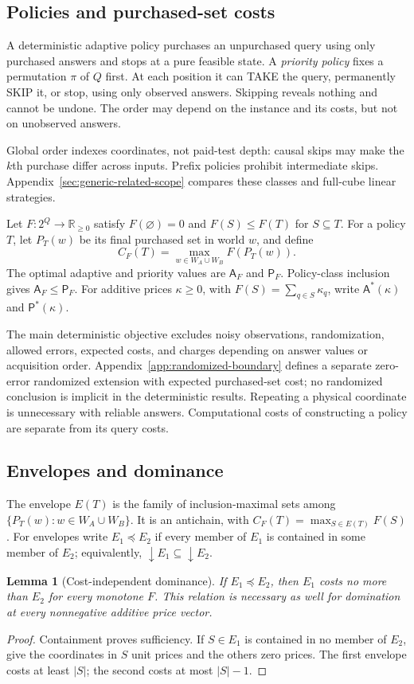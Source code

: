 \documentclass[pdflatex,sn-mathphys-num]{sn-jnl}
\newcommand{\A}{\mathsf{A}}
\newcommand{\Pcost}{\mathsf{P}}
\newcommand{\down}{\mathop{\downarrow}}
\theoremstyle{thmstyleone}
\newtheorem{lemma}[theorem]{Lemma}
\theoremstyle{thmstylethree}
\theoremstyle{thmstyletwo}
\begin{document}
\subsection{Policies and purchased-set costs}
A deterministic adaptive policy purchases an unpurchased query using only purchased answers and stops at a pure feasible state. A \emph{priority policy} fixes a permutation $\pi$ of $Q$ first. At each position it can TAKE the query, permanently SKIP it, or stop, using only observed answers. Skipping reveals nothing and cannot be undone. The order may depend on the instance and its costs, but not on unobserved answers.

Global order indexes coordinates, not paid-test depth: causal skips may make the $k$th purchase differ across inputs. Prefix policies prohibit intermediate skips. Appendix~\ref{sec:generic-related-scope} compares these classes and full-cube linear strategies.

Let $F:2^Q\to\mathbb R_{\geq0}$ satisfy $F(\varnothing)=0$ and $F(S)\leq F(T)$ for $S\subseteq T$. For a policy $T$, let $P_T(w)$ be its final purchased set in world $w$, and define
\[
 C_F(T)=\max_{w\in W_A\cup W_B} F(P_T(w)).
\]
The optimal adaptive and priority values are $\A_F$ and $\Pcost_F$. Policy-class inclusion gives $\A_F\leq\Pcost_F$. For additive prices $\kappa\geq0$, with $F(S)=\sum_{q\in S}\kappa_q$, write $\A^*(\kappa)$ and $\Pcost^*(\kappa)$.

The main deterministic objective excludes noisy observations, randomization, allowed errors, expected costs, and charges depending on answer values or acquisition order. Appendix~\ref{app:randomized-boundary} defines a separate zero-error randomized extension with expected purchased-set cost; no randomized conclusion is implicit in the deterministic results. Repeating a physical coordinate is unnecessary with reliable answers. Computational costs of constructing a policy are separate from its query costs.

\subsection{Envelopes and dominance}\label{sec:envelopes}
The envelope $E(T)$ is the family of inclusion-maximal sets among $\{P_T(w):w\in W_A\cup W_B\}$. It is an antichain, with $C_F(T)=\max_{S\in E(T)}F(S)$. For envelopes write $E_1\preceq E_2$ if every member of $E_1$ is contained in some member of $E_2$; equivalently, $\down E_1\subseteq\down E_2$.

\begin{lemma}[Cost-independent dominance]\label{lem:dominance}
If $E_1\preceq E_2$, then $E_1$ costs no more than $E_2$ for every monotone $F$. This relation is necessary as well for domination at every nonnegative additive price vector.
\end{lemma}
\begin{proof}
Containment proves sufficiency. If $S\in E_1$ is contained in no member of $E_2$, give the coordinates in $S$ unit prices and the others zero prices. The first envelope costs at least $|S|$; the second costs at most $|S|-1$.
\end{proof}
\end{document}
